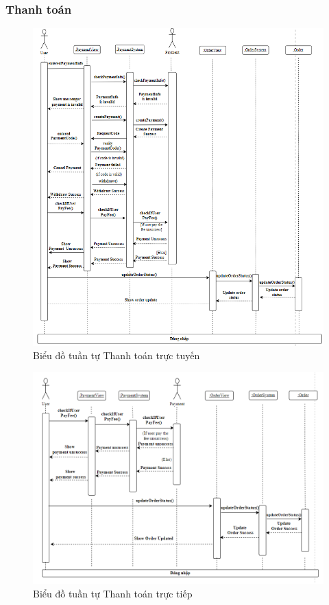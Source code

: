 \subsubsection{Thanh toán}
\begin{figure}[H]
    \centering
    \includegraphics[width=\textwidth]{img3.4/3.4.1thanhtoanbangtk.png} 
    \caption{Biểu đồ tuần tự Thanh toán trực tuyến}
\end{figure}

\begin{figure}[H]
    \centering
    \includegraphics[width=\textwidth]{img3.4/3.4.1thanhtoantructiep.png} 
    \caption{Biểu đồ tuần tự Thanh toán trực tiếp}
\end{figure}

